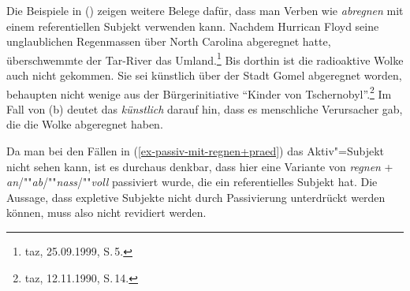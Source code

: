 \noindent
Die Beispiele in () zeigen weitere Belege dafür, dass man Verben wie \emph{abregnen} mit einem referentiellen
Subjekt verwenden kann.
\eal
\ex Nachdem Hurrican Floyd seine unglaublichen Regenmassen über North Carolina abgeregnet hatte, überschwemmte der Tar-River das Umland.\footnote{
 taz, 25.09.1999, S.\,5.
}
\ex Bis dorthin ist die radioaktive Wolke auch nicht gekommen. 
    Sie sei künstlich über der Stadt Gomel abgeregnet worden, behaupten nicht wenige aus der Bürgerinitiative "`Kinder von Tschernobyl"'.\footnote{
taz, 12.11.1990, S.\,14.
}
\zl
Im Fall von (b) deutet das \emph{künstlich} darauf hin, dass es menschliche Verursacher gab, die
die Wolke abgeregnet haben.

Da man bei den Fällen in (\ref{ex-passiv-mit-regnen+praed}) das Aktiv"=Subjekt nicht sehen kann,
ist es durchaus denkbar, dass hier eine Variante von \emph{regnen} + \emph{an}/""\emph{ab}/""\emph{nass}/""\emph{voll}
passiviert wurde, die ein referentielles Subjekt hat.
Die Aussage, dass expletive Subjekte nicht durch Passivierung unterdrückt werden können, muss also
nicht revidiert werden.


